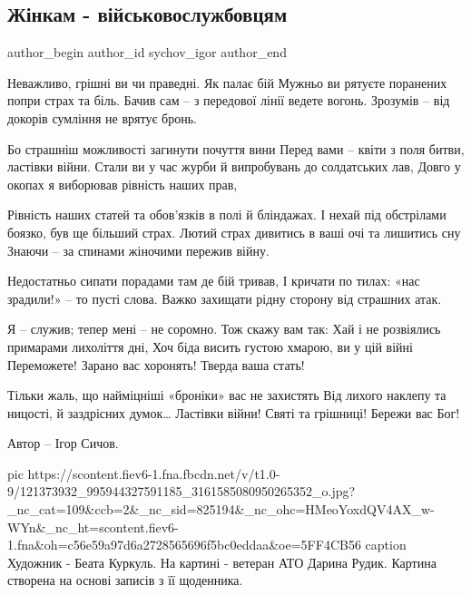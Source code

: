  
 
 
 
 

\subsection{Жінкам - військовослужбовцям}

\ifcmt
  author_begin
   author_id sychov_igor
  author_end
\fi

\begin{multicols}{2}
	\obeycr
Неважливо, грішні ви чи праведні. Як палає бій
Мужньо ви рятуєте поранених попри страх та біль.
Бачив сам – з передової лінії ведете вогонь.
Зрозумів – від докорів сумління не врятує бронь.

Бо страшніш можливості загинути почуття вини
Перед вами – квіти з поля битви, ластівки війни.
Стали ви у час журби й випробувань до солдатських лав,
Довго у окопах я виборював рівність наших прав,

Рівність наших статей та обов’язків в полі й бліндажах.
І нехай під обстрілами боязко, був ще більший страх.
Лютий страх дивитись в ваші очі та лишитись сну
Знаючи – за спинами жіночими пережив війну.

Недостатньо сипати порадами там де бій тривав,
І кричати по тилах: «нас зрадили!» – то пусті слова.
Важко захищати рідну сторону від страшних атак.

Я – служив; тепер мені – не соромно. Тож скажу вам так:
Хай і не розвіялись примарами лихоліття дні,
Хоч біда висить густою хмарою, ви у цій війні
Переможете! Зарано вас хоронять! Тверда ваша стать!

Тільки жаль, що найміцніші «броніки» вас не захистять
Від лихого наклепу та ницості, й заздрісних думок…
Ластівки війни! Святі та грішниці! Бережи вас Бог!

Автор – Ігор Сичов.
	\restorecr
\end{multicols}

\ifcmt
pic https://scontent.fiev6-1.fna.fbcdn.net/v/t1.0-9/121373932_995944327591185_3161585080950265352_o.jpg?_nc_cat=109&ccb=2&_nc_sid=825194&_nc_ohc=HMeoYoxdQV4AX_w-WYn&_nc_ht=scontent.fiev6-1.fna&oh=c56e59a97d6a2728565696f5bc0eddaa&oe=5FF4CB56
caption Художник - Беата Куркуль. На картині - ветеран АТО Дарина Рудик. Картина створена на основі записів з її щоденника.
\fi
